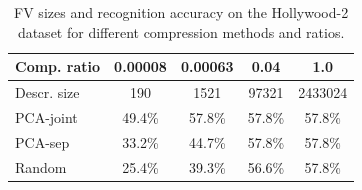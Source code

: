 \documentclass[10pt,twocolumn,letterpaper]{article}
\begin{document}
\begin{table}
\begin{center}
\begin{tabular}{|l|c|c|c|c|}
\hline
Comp. ratio             &  0.00008  &     0.00063 &          0.04 &          1.0 \\\hline
Descr. size             &       190 &         1521 &         97321 &      2433024 \\\hline\hline
PCA-joint         &     49.4\% &        57.8\% &         57.8\% &        57.8\% \\\hline
PCA-sep           &     33.2\% &        44.7\% &         57.8\% &        57.8\% \\\hline
Random            &     25.4\% &        39.3\% &         56.6\% &        57.8\% \\\hline
\end{tabular}
\vspace{.0cm}%
\caption{FV sizes and recognition accuracy on the Hollywood-2 dataset for different compression methods and ratios.\vspace{-.6cm}}
\label{tab:compression}
\end{center}
\end{table}


\end{document}
